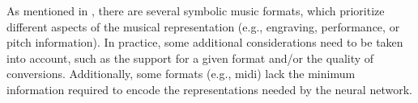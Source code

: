 

As mentioned in , there are
several symbolic music formats, which prioritize different
aspects of the musical representation (e.g., engraving,
performance, or pitch information). In practice, some
additional considerations need to be taken into account,
such as the support for a given format and/or the quality of
conversions. Additionally, some formats (e.g., \gls{midi})
lack the minimum information required to encode the
representations needed by the neural network.
